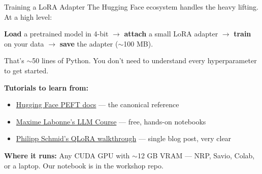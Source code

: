\documentclass[aspectratio=169]{beamer}
\begin{document}
\begin{frame}{Training a LoRA Adapter}
    The Hugging Face ecosystem handles the heavy lifting. At a high level:

    \vspace{0.5em}
    \textbf{Load} a pretrained model in 4-bit $\rightarrow$ \textbf{attach} a small LoRA adapter $\rightarrow$ \textbf{train} on your data $\rightarrow$ \textbf{save} the adapter ($\sim$100 MB).

    \vspace{0.5em}
    That's $\sim$50 lines of Python. You don't need to understand every hyperparameter to get started.

    \vspace{0.7em}
    \textbf{Tutorials to learn from:}
    \begin{itemize}
        \vspace{0.2em}
        \item \href{https://huggingface.co/docs/peft}{Hugging Face PEFT docs} --- the canonical reference
        \item \href{https://github.com/mlabonne/llm-course}{Maxime Labonne's LLM Course} --- free, hands-on notebooks
        \item \href{https://www.philschmid.de/fine-tune-llms-in-2024-with-trl}{Philipp Schmid's QLoRA walkthrough} --- single blog post, very clear
    \end{itemize}

    \vspace{0.7em}
    \textbf{Where it runs:} Any CUDA GPU with $\sim$12 GB VRAM --- NRP, Savio, Colab, or a laptop. Our notebook is in the workshop repo.
\end{frame}
\end{document}
